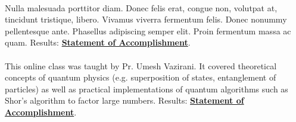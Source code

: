 \documentclass[theme]{cv_einstein}
\begin{document}
\begin{paracol}{2}
\begin{leftcolumn*}
{{\begin{minipage}[l]{0.9\leftcolwidth}
                    \vspace{\itemspace}\\
                \end{minipage}
            }%
        } %
        \end{leftcolumn*}
        \begin{rightcolumn}\noindent \small
            \hspace{-2.4pt}
            {Nulla malesuada porttitor diam. Donec felis erat, congue non, volutpat at, tincidunt tristique, libero. Vivamus viverra fermentum felis. Donec nonummy pellentesque ante. Phasellus adipiscing semper elit. Proin fermentum massa ac quam.}
            {Results: \href{http://example.com}{\textbf{Statement of Accomplishment}}.
            }\\
            \vspace{\itemspace}\\
            {This online class was taught by Pr. Umesh Vazirani. It covered theoretical concepts of quantum physics (e.g. superposition of states, entanglement of particles) as well as practical implementations of quantum algorithms such as Shor's algorithm to factor large numbers.}
            {Results: \href{http://example.com}{\textbf{Statement of Accomplishment}}.}


\end{rightcolumn}
\end{paracol}
\end{document}
